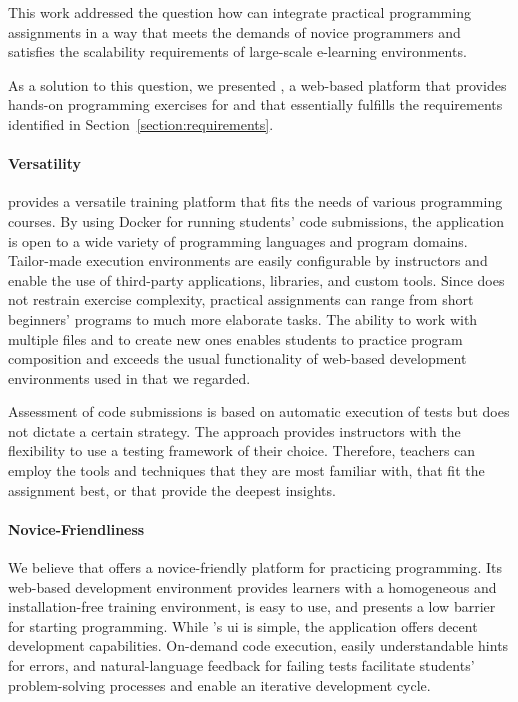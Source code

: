 This work addressed the question how \moocs can integrate practical programming assignments in a way that meets the demands of novice programmers and satisfies the scalability requirements of large-scale e-learning environments.

As a solution to this question, we presented \tool, a web-based platform that provides hands-on programming exercises for \moocs and that essentially fulfills the requirements identified in Section~\ref{section:requirements}.

\paragraph{Versatility}

\tool provides a versatile training platform that fits the needs of various programming courses. By using Docker for running students' code submissions, the application is open to a wide variety of programming languages and program domains. Tailor-made execution environments are easily configurable by instructors and enable the use of third-party applications, libraries, and custom tools. Since \tool does not restrain exercise complexity, practical assignments can range from short beginners' programs to much more elaborate tasks. The ability to work with multiple files and to create new ones enables students to practice program composition and exceeds the usual functionality of web-based development environments used in \moocs that we regarded.

Assessment of code submissions is based on automatic execution of tests but does not dictate a certain strategy. The approach provides instructors with the flexibility to use a testing framework of their choice. Therefore, teachers can employ the tools and techniques that they are most familiar with, that fit the assignment best, or that provide the deepest insights.

\paragraph{Novice-Friendliness}

We believe that \tool offers a novice-friendly platform for practicing programming. Its web-based development environment provides learners with a homogeneous and installation-free training environment, is easy to use, and presents a low barrier for starting programming. While \tool's \gls{ui} is simple, the application offers decent development capabilities. On-demand code execution, easily understandable hints for errors, and natural-language feedback for failing tests facilitate students' problem-solving processes and enable an iterative development cycle.

